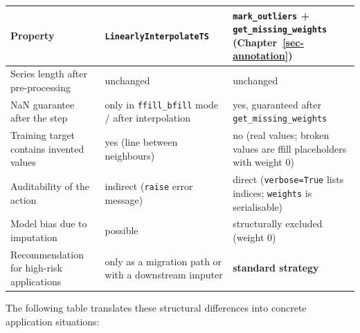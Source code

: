 \documentclass[
  english,
  letterpaper,
]{scrbook}
\newcounter{none} %
\begin{document}
{\def\LTcaptype{none} %
\begin{longtable}[]{@{}
  >{\raggedright\arraybackslash}p{}
  >{\raggedright\arraybackslash}p{}
  >{\raggedright\arraybackslash}p{}@{}}
\toprule\noalign{}
\begin{minipage}[b]{\linewidth}\raggedright
Property
\end{minipage} & \begin{minipage}[b]{\linewidth}\raggedright
\texttt{LinearlyInterpolateTS}
\end{minipage} & \begin{minipage}[b]{\linewidth}\raggedright
\texttt{mark\_outliers} + \texttt{get\_missing\_weights}
(Chapter~\ref{sec-annotation})
\end{minipage} \\
\midrule\noalign{}
\endhead
\bottomrule\noalign{}
\endlastfoot
Series length after pre-processing & unchanged & unchanged \\
NaN guarantee after the step & only in \texttt{ffill\_bfill} mode /
after interpolation & yes, guaranteed after
\texttt{get\_missing\_weights} \\
Training target contains invented values & yes (line between neighbours)
& no (real values; broken values are ffill placeholders with weight
0) \\
Auditability of the action & indirect (\texttt{raise} error message) &
direct (\texttt{verbose=True} lists indices; \texttt{weights} is
serialisable) \\
Model bias due to imputation & possible & structurally excluded (weight
0) \\
Recommendation for high-risk applications & only as a migration path or
with a downstream imputer & \textbf{standard strategy} \\
\end{longtable}
}

The following table translates these structural differences into
concrete application situations:
\end{document}
